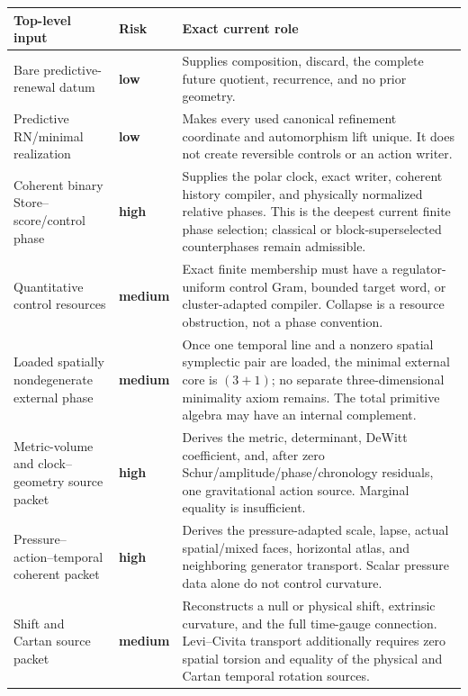 \documentclass[11pt]{article}
\theoremstyle{definition}
\theoremstyle{remark}
\newcommand{\lowrisk}{\textcolor{deepgreen}{\textbf{low}}}
\newcommand{\mediumrisk}{\textcolor{deepblue}{\textbf{medium}}}
\newcommand{\highrisk}{\textcolor{deepred}{\textbf{high}}}
\begin{document}
\begingroup
\small
\setlength{\tabcolsep}{4pt}
\begin{longtable}{L{0.22\textwidth}L{0.14\textwidth}L{0.54\textwidth}}
\toprule
\textbf{Top-level input} & \textbf{Risk} & \textbf{Exact current role}\\
\midrule
\endhead
Bare predictive-renewal datum
& \lowrisk
& Supplies composition, discard, the complete future quotient, recurrence, and no prior geometry.\\
\addlinespace
Predictive RN/minimal realization
& \lowrisk
& Makes every used canonical refinement coordinate and automorphism lift unique.  It does not create reversible controls or an action writer.\\
\addlinespace
Coherent binary Store--score/control phase
& \highrisk
& Supplies the polar clock, exact writer, coherent history compiler, and physically normalized relative phases.  This is the deepest current finite phase selection; classical or block-superselected counterphases remain admissible.\\
\addlinespace
Quantitative control resources
& \mediumrisk
& Exact finite membership must have a regulator-uniform control Gram, bounded target word, or cluster-adapted compiler.  Collapse is a resource obstruction, not a phase convention.\\
\addlinespace
Loaded spatially nondegenerate external phase
& \mediumrisk
& Once one temporal line and a nonzero spatial symplectic pair are loaded, the minimal external core is \((3+1)\); no separate three-dimensional minimality axiom remains.  The total primitive algebra may have an internal complement.\\
\addlinespace
Metric-volume and clock--geometry source packet
& \highrisk
& Derives the metric, determinant, DeWitt coefficient, and, after zero Schur/amplitude/phase/chronology residuals, one gravitational action source.  Marginal equality is insufficient.\\
\addlinespace
Pressure--action--temporal coherent packet
& \highrisk
& Derives the pressure-adapted scale, lapse, actual spatial/mixed faces, horizontal atlas, and neighboring generator transport.  Scalar pressure data alone do not control curvature.\\
\addlinespace
Shift and Cartan source packet
& \mediumrisk
& Reconstructs a null or physical shift, extrinsic curvature, and the full time-gauge connection.  Levi--Civita transport additionally requires zero spatial torsion and equality of the physical and Cartan temporal rotation sources.\\

\end{longtable}
\end{document}
